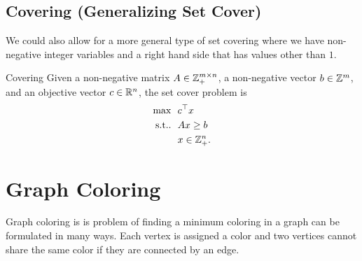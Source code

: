 






\subsection{Covering (Generalizing Set Cover)}
We could also allow for a more general type of set covering where we have non-negative integer variables and a right hand side that has values other than $1$.
\begin{general}{Covering}{\npcomplete}
\label{general:covering}
Given a non-negative matrix $A \in {\mathbb{Z}}_+^{m \times n}$, a non-negative vector $b \in {\mathbb{Z}}^m$, and an objective vector $c \in {\mathbb{R}}^n$, the set cover problem is
\begin{equation}
\begin{split}
\max \ \ & c^\top x\\
\mbox{s.t.}. \ \ & Ax \geq b \\
& x \in{\mathbb{Z}}^n_+.
\end{split}
\end{equation}
\end{general}

%
%






\section{Graph Coloring}


Graph coloring  is 
is problem of finding a minimum coloring in a graph can be formulated in many ways. Each vertex is assigned a color and two vertices cannot share the same color if they are connected by an edge.

